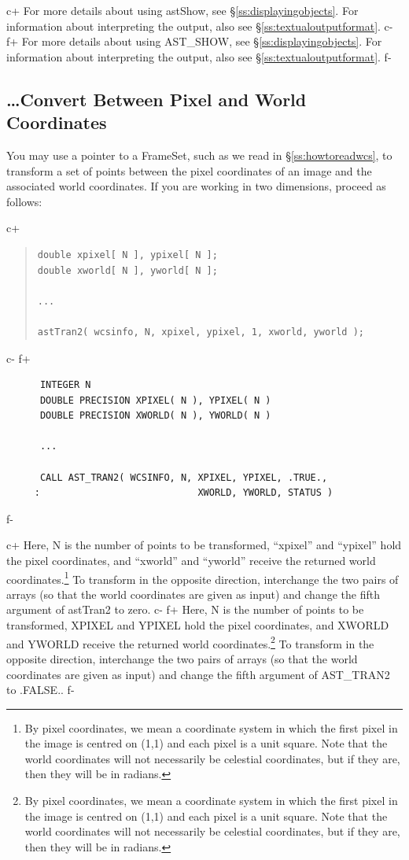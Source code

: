 \documentclass[twoside,11pt]{article}
\newcommand{\secref}[1]{\S\ref{#1}}
\newcommand{\secref}[1]{\ref{#1}}
\begin{document}
c+
For more details about using astShow, see
\secref{ss:displayingobjects}. For information about interpreting the
output, also see \secref{ss:textualoutputformat}.
c-
f+
For more details about using AST\_SHOW, see
\secref{ss:displayingobjects}. For information about interpreting the
output, also see \secref{ss:textualoutputformat}.
f-

\subsection{\label{ss:howtotransform}\ldots Convert Between Pixel and World Coordinates}

You may use a pointer to a FrameSet, such as we read in
\secref{ss:howtoreadwcs}, to transform a set of points between the
pixel coordinates of an image and the associated world coordinates. If
you are working in two dimensions, proceed as follows:

c+
\begin{quote}
\small
\begin{verbatim}
double xpixel[ N ], ypixel[ N ];
double xworld[ N ], yworld[ N ];

...

astTran2( wcsinfo, N, xpixel, ypixel, 1, xworld, yworld );
\end{verbatim}
\normalsize
\end{quote}
c-
f+
\small
\begin{verbatim}
      INTEGER N
      DOUBLE PRECISION XPIXEL( N ), YPIXEL( N )
      DOUBLE PRECISION XWORLD( N ), YWORLD( N )

      ...

      CALL AST_TRAN2( WCSINFO, N, XPIXEL, YPIXEL, .TRUE.,
     :                            XWORLD, YWORLD, STATUS )
\end{verbatim}
\normalsize
f-

c+
Here, N is the number of points to be transformed, ``xpixel'' and
``ypixel'' hold the pixel coordinates, and ``xworld'' and ``yworld''
receive the returned world coordinates.\footnote{By pixel coordinates,
we mean a coordinate system in which the first pixel in the image is
centred on (1,1) and each pixel is a unit square.  Note that the world
coordinates will not necessarily be celestial coordinates, but if they
are, then they will be in radians.}  To transform in the opposite
direction, interchange the two pairs of arrays (so that the world
coordinates are given as input) and change the fifth argument of
astTran2 to zero.
c-
f+
Here, N is the number of points to be transformed, XPIXEL and YPIXEL
hold the pixel coordinates, and XWORLD and YWORLD receive the returned
world coordinates.\footnote{By pixel coordinates, we mean a coordinate
system in which the first pixel in the image is centred on (1,1) and
each pixel is a unit square.  Note that the world coordinates will not
necessarily be celestial coordinates, but if they are, then they will
be in radians.}  To transform in the opposite direction, interchange
the two pairs of arrays (so that the world coordinates are given as
input) and change the fifth argument of AST\_TRAN2 to .FALSE..
f-
\end{document}
